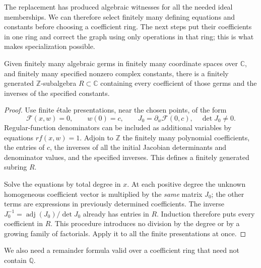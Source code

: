 The replacement has produced algebraic witnesses for all the needed
ideal memberships. We can therefore select finitely many defining
equations and constants before choosing a coefficient ring. The next
steps put their coefficients in one ring and correct the graph using
only operations in that ring; this is what makes specialization
possible.

\begin{lemma}
\label{alg:finite-ring}
Given finitely many algebraic germs in finitely many coordinate spaces
over $\mathbb C$, and finitely many specified nonzero complex constants,
there is a finitely generated $\mathbb Z$-subalgebra $R\subset\mathbb C$
containing every coefficient of those germs and the inverses of the
specified constants.
\end{lemma}

\begin{proof}
Use finite \'etale presentations, near the chosen points, of the
form
\[
 \mathcal F(x,w)=0,\qquad w(0)=c,\qquad
 J_0=\partial_w\mathcal F(0,c),\quad\det J_0\ne0.
\]
Regular-function denominators can be included as additional variables
by equations $r f(x,w)=1$. Adjoin to $\mathbb Z$ the finitely many
polynomial coefficients, the entries of $c$, the inverses of all the
initial Jacobian determinants and denominator values, and the
specified inverses. This defines a finitely generated subring $R$.

Solve the equations by total degree in $x$. At each positive degree
the unknown homogeneous coefficient vector is multiplied by the
\emph{same} matrix $J_0$; the other terms are expressions in previously
determined coefficients. The inverse
$J_0^{-1}=\operatorname{adj}(J_0)/\det J_0$ already has entries in $R$.
Induction therefore puts every coefficient in $R$. This procedure
introduces no division by the degree or by a growing family of
factorials. Apply it to all the finite presentations at once.
\end{proof}

We also need a remainder formula valid over a coefficient ring that
need not contain $\mathbb Q$.

